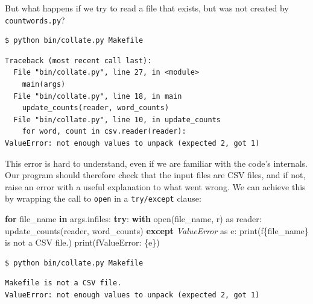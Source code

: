 \documentclass[
]{krantz}
\makeatletter
\newenvironment{Shaded}{\begin{snugshade}}{\end{snugshade}}
\newcommand{\BuiltInTok}[1]{#1}
\newcommand{\ControlFlowTok}[1]{\textcolor[rgb]{0.13,0.29,0.53}{\textbf{#1}}}
\newcommand{\ImportTok}[1]{#1}
\newcommand{\KeywordTok}[1]{\textcolor[rgb]{0.13,0.29,0.53}{\textbf{#1}}}
\newcommand{\NormalTok}[1]{#1}
\newcommand{\PreprocessorTok}[1]{\textcolor[rgb]{0.56,0.35,0.01}{\textit{#1}}}
\newcommand{\SpecialCharTok}[1]{\textcolor[rgb]{0.00,0.00,0.00}{#1}}
\newcommand{\SpecialStringTok}[1]{\textcolor[rgb]{0.31,0.60,0.02}{#1}}
\newcommand{\StringTok}[1]{\textcolor[rgb]{0.31,0.60,0.02}{#1}}
\newenvironment{kframe}{%
\medskip{}
\setlength{\fboxsep}{.8em}
 \def\at@end@of@kframe{}%
 \ifinner\ifhmode%
  \def\at@end@of@kframe{\end{minipage}}%
  \begin{minipage}{\columnwidth}%
 \fi\fi%
 \def\FrameCommand##1{\hskip\@totalleftmargin \hskip-\fboxsep
 \colorbox{shadecolor}{##1}\hskip-\fboxsep
     \hskip-\linewidth \hskip-\@totalleftmargin \hskip\columnwidth}%
 \MakeFramed {\advance\hsize-\width
   \@totalleftmargin\z@ \linewidth\hsize
   \@setminipage}}%
 {\par\unskip\endMakeFramed%
 \at@end@of@kframe}
\renewenvironment{Shaded}{\begin{kframe}}{\end{kframe}}
\makeatother
\begin{document}
But what happens if we try to read a file that exists,
but was not created by \texttt{countwords.py}?

\begin{verbatim}
$ python bin/collate.py Makefile
\end{verbatim}

\begin{verbatim}
Traceback (most recent call last):
  File "bin/collate.py", line 27, in <module>
    main(args)
  File "bin/collate.py", line 18, in main
    update_counts(reader, word_counts)
  File "bin/collate.py", line 10, in update_counts
    for word, count in csv.reader(reader):
ValueError: not enough values to unpack (expected 2, got 1)
\end{verbatim}

This error is hard to understand,
even if we are familiar with the code's internals.
Our program should therefore check that the input files are CSV files,
and if not,
raise an error with a useful explanation to what went wrong.
We can achieve this by wrapping the call to \texttt{open} in a \texttt{try/except} clause:

\begin{Shaded}
\begin{Highlighting}[]
\ControlFlowTok{for}\NormalTok{ file\_name }\KeywordTok{in}\NormalTok{ args.infiles:}
    \ControlFlowTok{try}\NormalTok{:}
        \ControlFlowTok{with} \BuiltInTok{open}\NormalTok{(file\_name, }\StringTok{\textquotesingle{}r\textquotesingle{}}\NormalTok{) }\ImportTok{as}\NormalTok{ reader:}
\NormalTok{            update\_counts(reader, word\_counts)}
    \ControlFlowTok{except} \PreprocessorTok{ValueError} \ImportTok{as}\NormalTok{ e:}
        \BuiltInTok{print}\NormalTok{(}\SpecialStringTok{f\textquotesingle{}}\SpecialCharTok{\{}\NormalTok{file\_name}\SpecialCharTok{\}}\SpecialStringTok{ is not a CSV file.\textquotesingle{}}\NormalTok{)}
        \BuiltInTok{print}\NormalTok{(}\SpecialStringTok{f\textquotesingle{}ValueError: }\SpecialCharTok{\{e\}}\SpecialStringTok{\textquotesingle{}}\NormalTok{)}
\end{Highlighting}
\end{Shaded}

\begin{verbatim}
$ python bin/collate.py Makefile
\end{verbatim}

\begin{verbatim}
Makefile is not a CSV file.
ValueError: not enough values to unpack (expected 2, got 1)
\end{verbatim}
\end{document}
